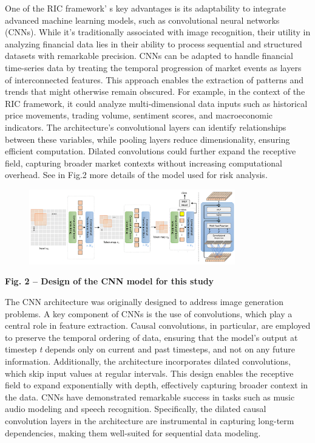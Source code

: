 {One of the RIC framework' s key advantages is its
adaptability to integrate advanced machine learning models, such as
convolutional neural networks (CNNs). While it's traditionally
associated with image recognition, their utility in analyzing financial
data lies in their ability to process sequential and structured datasets
with remarkable precision. CNNs can be adapted to handle financial
time-series data by treating the temporal progression of market events
as layers of interconnected features. This approach enables the
extraction of patterns and trends that might otherwise remain obscured.
For example, in the context of the RIC framework, it could analyze
multi-dimensional data inputs such as historical price movements,
trading volume, sentiment scores, and macroeconomic indicators. The
architecture's convolutional layers can identify relationships between
these variables, while pooling layers reduce dimensionality, ensuring
efficient computation. Dilated convolutions could further expand the
receptive field, capturing broader market contexts without increasing
computational overhead. See in Fig.2 more details of the model used for
risk analysis.

\begin{figure}[H]
	\centering
	\includegraphics[width=0.8\textwidth]{media/ict2/image10}
	\caption*{}
\end{figure}


{\bfseries Fig. 2 -- Design of the CNN model for this study}

The CNN architecture was originally designed to address image generation
problems. A key component of CNNs is the use of convolutions, which play
a central role in feature extraction. Causal convolutions, in
particular, are employed to preserve the temporal ordering of data,
ensuring that the model's output at timestep \emph{t} depends only on
current and past timesteps, and not on any future information.
Additionally, the architecture incorporates dilated convolutions, which
skip input values at regular intervals. This design enables the
receptive field to expand exponentially with depth, effectively
capturing broader context in the data. CNNs have demonstrated remarkable
success in tasks such as music audio modeling and speech recognition.
Specifically, the dilated causal convolution layers in the architecture
are instrumental in capturing long-term dependencies, making them
well-suited for sequential data modeling.

}
